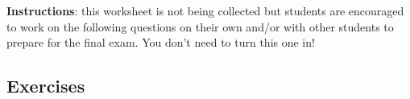 \documentclass[11pt]{exam}
\begin{document}
    
\vspace*{-1cm}

\begin{center}
{\Large \TestName}
\end{center}


\vspace{6pt}
\textbf{Instructions}: this worksheet is not being collected but students are encouraged to work on the following questions on their own and/or with other students to prepare for the final exam. You don't need to turn this one in! 
\def\dm{\displaystyle}

% 
% 

\subsection*{Exercises}
\end{document}
